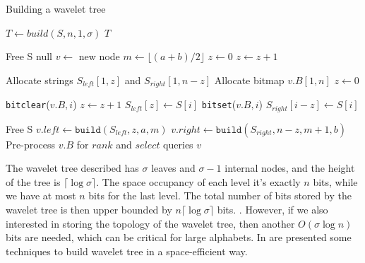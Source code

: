 \begin{algorithm}[ht!]
    \caption{Building a wavelet tree}\label{alg:build_wt}
    \begin{algorithmic}

        \State $T \gets build(S,n,1,\sigma)$
        \State \Return $T$
        \EndFunction


         
        \State Free S
        \State \Return null
        \EndIf
        \State $v \gets$ new node
        \State $m \gets \lfloor (a+b)/2 \rfloor$
        \State $z \gets 0$ 
        \State $z \gets z+1$
        \EndIf
        \EndFor

        \State Allocate strings $S_{left}[1,z]$ and $S_{right}[1,n-z]$
        \State Allocate bitmap $v.B[1,n]$
        \State $z \gets 0$

        \State \texttt{bitclear}($v.B,i$) 
        \State $z \gets z+1$
        \State $S_{left}[z] \gets S[i]$
        \Else
        \State \texttt{bitset}($v.B,i$) 
        \State $S_{right}[i-z] \gets S[i]$
        \EndIf
        \EndFor

        \State Free S
        \State $v.left \gets \texttt{build}(S_{left},z,a,m)$
        \State $v.right \gets \texttt{build}(S_{right},n-z,m+1,b)$
        \State Pre-process $v.B$ for $rank$ and $select$ queries
        \State \Return $v$
        \EndFunction
    \end{algorithmic}
\end{algorithm}

\begin{remark} \label{rem:space_occupancy_wavelet_tree}
    The wavelet tree described has $\sigma$ leaves and $\sigma-1$ internal nodes, and the height of the tree is $ \lceil \log \sigma \rceil$. The space occupancy of each level it's exactly $n$ bits, while we have at most $n$ bits for the last level. The total number of bits stored by the wavelet tree is then upper bounded by $n \lceil \log \sigma \rceil$ bits. \cite{WTForALL}. However, if we also interested in storing the topology of the wavelet tree, then another $O(\sigma \log n)$ bits are needed, which can be critical for large alphabets. In \cite{claude2011space,tischler2011wavelet} are presented some techniques to build wavelet tree in a space-efficient way.
\end{remark}

